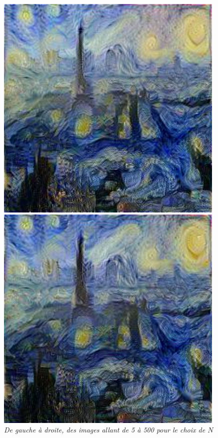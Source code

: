 \documentclass{article}
\begin{document}
\begin{figure}[!htb]
\begin{minipage}{0.2\textwidth}
\end{minipage}%
\begin{minipage}{0.2\textwidth}
\centering
\includegraphics[width=0.98\textwidth]{../Images/transfer/paris_starrynight_1e4_250.jpg}
\end{minipage}%
\begin{minipage}{0.2\textwidth}
\centering
\includegraphics[width=0.98\textwidth]{../Images/transfer/paris_starrynight_1e4_500.jpg}
\end{minipage}
\caption{\textit{De gauche à droite, des images allant de 5 à 500 pour le choix de $N$}}
\label{fig:varier_iteration}
\end{figure}
\end{document}
